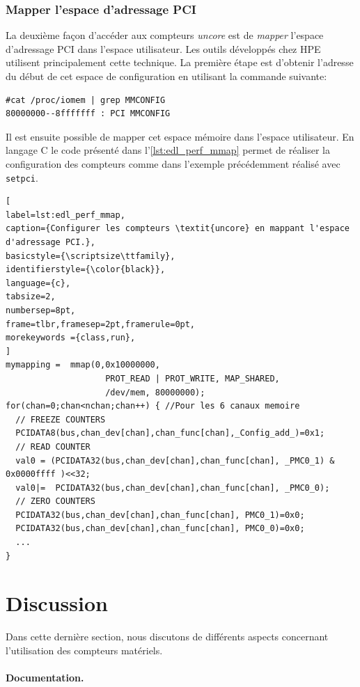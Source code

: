     \subsubsection{Mapper l'espace d'adressage PCI}\label{annexe:hc_pcimap}
        La deuxième façon d'accéder aux \glspl{compteur} \textit{uncore} est de \textit{mapper} l'espace d'adressage PCI dans l'espace utilisateur. Les outils développés chez HPE utilisent principalement cette technique. La première étape est d'obtenir l'adresse du début de cet espace de configuration en utilisant la commande suivante:
\begin{verbatim}
#cat /proc/iomem | grep MMCONFIG  
80000000--8fffffff : PCI MMCONFIG
\end{verbatim}
        Il est ensuite possible de mapper cet espace mémoire dans l'espace utilisateur. En langage C le code présenté dans l'\autoref{lst:edl_perf_mmap} permet de réaliser la configuration des compteurs comme dans l'exemple précédemment réalisé avec \verb|setpci|.
    \begin{lstlisting}[
label=lst:edl_perf_mmap,
caption={Configurer les compteurs \textit{uncore} en mappant l'espace d'adressage PCI.},
basicstyle={\scriptsize\ttfamily},
identifierstyle={\color{black}},
language={c},
tabsize=2,
numbersep=8pt,
frame=tlbr,framesep=2pt,framerule=0pt,
morekeywords ={class,run},
]
mymapping =  mmap(0,0x10000000, 
		            PROT_READ | PROT_WRITE, MAP_SHARED, 		 
		            /dev/mem, 80000000);
for(chan=0;chan<nchan;chan++) { //Pour les 6 canaux memoire 
  // FREEZE COUNTERS 
  PCIDATA8(bus,chan_dev[chan],chan_func[chan],_Config_add_)=0x1; 
  // READ COUNTER 
  val0 = (PCIDATA32(bus,chan_dev[chan],chan_func[chan], _PMC0_1) & 0x0000ffff )<<32; 
  val0|=  PCIDATA32(bus,chan_dev[chan],chan_func[chan], _PMC0_0); 
  // ZERO COUNTERS 
  PCIDATA32(bus,chan_dev[chan],chan_func[chan], PMC0_1)=0x0;
  PCIDATA32(bus,chan_dev[chan],chan_func[chan], PMC0_0)=0x0;
  ...
}  
\end{lstlisting}
    

\section{Discussion}

    Dans cette dernière section, nous discutons de différents aspects concernant l'utilisation des compteurs matériels. 
    
   

    \paragraph{Documentation.}
        
